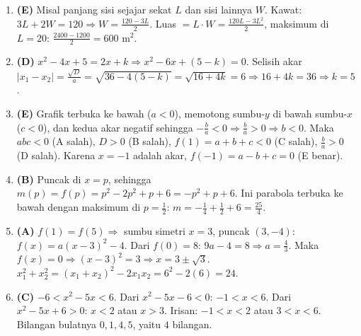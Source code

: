 \documentclass[a4paper,11pt]{article}
\newcommand{\dis}{\displaystyle}
\newcounter{no}
\begin{document}
\begin{enumerate}[leftmargin=2em,itemsep=2pt,topsep=2pt]
\item[\textbf{15.}] \textbf{(E)} Misal panjang sisi sejajar sekat $L$ dan sisi lainnya $W$. Kawat: $3L+2W=120\Rightarrow W=\dis\frac{120-3L}{2}$. Luas $=L\cdot W=\dis\frac{120L-3L^{2}}{2}$, maksimum di $L=20$: $\dis\frac{2400-1200}{2}=600$ m$^{2}$.
\item[\textbf{16.}] \textbf{(D)} $x^{2}-4x+5=2x+k\Rightarrow x^{2}-6x+(5-k)=0$. Selisih akar $|x_{1}-x_{2}|=\dis\frac{\sqrt D}{a}=\sqrt{36-4(5-k)}=\sqrt{16+4k}=6\Rightarrow16+4k=36\Rightarrow k=5$.
\item[\textbf{17.}] \textbf{(E)} Grafik terbuka ke bawah ($a<0$), memotong sumbu-$y$ di bawah sumbu-$x$ ($c<0$), dan kedua akar negatif sehingga $-\dis\frac ba<0\Rightarrow\dis\frac ba>0\Rightarrow b<0$. Maka $abc<0$ (A salah), $D>0$ (B salah), $f(1)=a+b+c<0$ (C salah), $\dis\frac ba>0$ (D salah). Karena $x=-1$ adalah akar, $f(-1)=a-b+c=0$ (E benar).
\item[\textbf{18.}] \textbf{(B)} Puncak di $x=p$, sehingga $m(p)=f(p)=p^{2}-2p^{2}+p+6=-p^{2}+p+6$. Ini parabola terbuka ke bawah dengan maksimum di $p=\dis\frac12$: $m=-\dis\frac14+\dis\frac12+6=\dis\frac{25}{4}$.
\item[\textbf{19.}] \textbf{(A)} $f(1)=f(5)\Rightarrow$ sumbu simetri $x=3$, puncak $(3,-4)$: $f(x)=a(x-3)^{2}-4$. Dari $f(0)=8$: $9a-4=8\Rightarrow a=\dis\frac43$. Maka $f(x)=0\Rightarrow(x-3)^{2}=3\Rightarrow x=3\pm\sqrt3$. $x_{1}^{2}+x_{2}^{2}=(x_1+x_2)^2-2x_1x_2=6^{2}-2(6)=24$.
\item[\textbf{20.}] \textbf{(C)} $-6<x^{2}-5x<6$. Dari $x^{2}-5x-6<0$: $-1<x<6$. Dari $x^{2}-5x+6>0$: $x<2$ atau $x>3$. Irisan: $-1<x<2$ atau $3<x<6$. Bilangan bulatnya $0,1,4,5$, yaitu $4$ bilangan.
\end{enumerate}
\par{}\par\vspace{0.2em}
\end{document}
